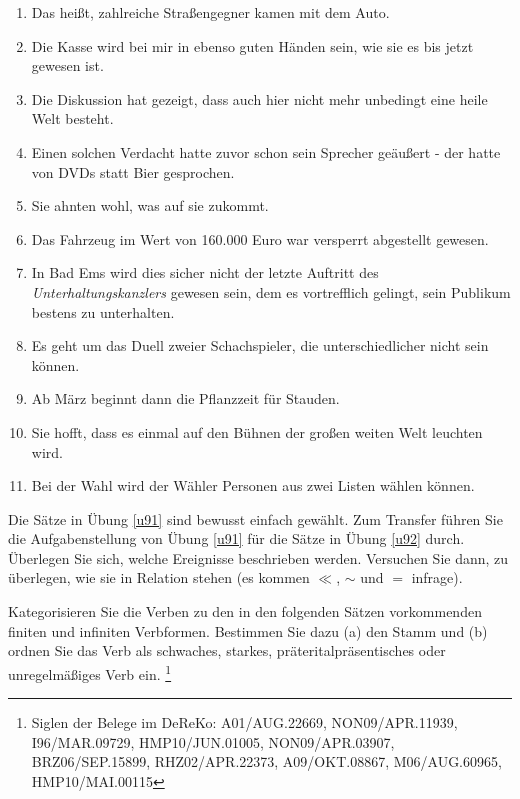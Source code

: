 \begin{sloppypar}
\begin{enumerate}
  \item Das heißt, zahlreiche Straßengegner kamen mit dem Auto.
  \item Die Kasse wird bei mir in ebenso guten Händen sein, wie sie es bis jetzt gewesen ist.
  \item Die Diskussion hat gezeigt, dass auch hier nicht mehr unbedingt eine heile Welt besteht.
  \item Einen solchen Verdacht hatte zuvor schon sein Sprecher geäußert - der hatte von DVDs statt Bier gesprochen.
  \item Sie ahnten wohl, was auf sie zukommt.
  \item Das Fahrzeug im Wert von 160.000 Euro war versperrt abgestellt gewesen.
  \item In Bad Ems wird dies sicher nicht der letzte Auftritt des \textit{Unterhaltungskanzlers} gewesen sein, dem es vortrefflich gelingt, sein Publikum bestens zu unterhalten.
  \item Es geht um das Duell zweier Schachspieler, die unterschiedlicher nicht sein können.
  \item Ab März beginnt dann die Pflanzzeit für Stauden.
  \item Sie hofft, dass es einmal auf den Bühnen der großen weiten Welt leuchten wird.
  \item Bei der Wahl wird der Wähler Personen aus zwei Listen wählen können.
\end{enumerate}

\Uebung[\tristar] \label{u93} Die Sätze in Übung \ref{u91} sind bewusst einfach gewählt.
Zum Transfer führen Sie die Aufgabenstellung von Übung \ref{u91} für die Sätze in Übung \ref{u92} durch.
Überlegen Sie sich, welche Ereignisse beschrieben werden.
Versuchen Sie dann, zu überlegen, wie sie in Relation stehen (es kommen $\ll$, $\sim$ und $=$ infrage).

\Uebung \label{u94} Kategorisieren Sie die Verben zu den in den folgenden Sätzen vorkommenden finiten und infiniten Verbformen.
Bestimmen Sie dazu (a) den Stamm und (b) ordnen Sie das Verb als schwaches, starkes, präteritalpräsentisches oder unregelmäßiges Verb ein.%
\footnote{Siglen der Belege im DeReKo: A01\slash AUG.22669, NON09\slash APR.11939, I96\slash MAR.09729, HMP10\slash JUN.01005, NON09\slash APR.03907, BRZ06\slash SEP.15899, RHZ02\slash APR.22373, A09\slash OKT.08867, M06\slash AUG.60965, HMP10\slash MAI.00115}


\end{sloppypar}
